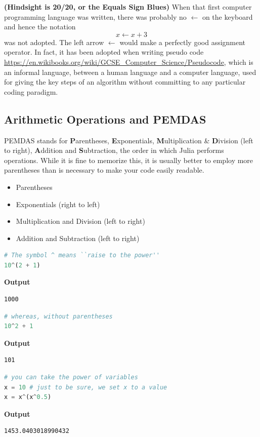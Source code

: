 \begin{rem} \textbf{(Hindsight is 20/20, or the Equals Sign Blues)}
When that first computer programming language was written, there was probably no $\leftarrow$ on the keyboard and hence the notation 
$$ x \leftarrow x+3$$
was not adopted. The left arrow $\leftarrow$ would make a perfectly good assignment operator. In fact, it has been adopted when writing pseudo code \url{https://en.wikibooks.org/wiki/GCSE_Computer_Science/Pseudocode}, which is an informal language, between a human language and a computer language, used for giving the key steps of an algorithm without committing to any particular coding paradigm.
\end{rem}


\subsection{Arithmetic Operations and PEMDAS}

PEMDAS stands for \textbf{P}arentheses, \textbf{E}xponentials, \textbf{M}ultiplication \& \textbf{D}ivision (left to right), \textbf{A}ddition and \textbf{S}ubtraction, the order in which Julia performs operations. While it is fine to memorize this, it is usually better to employ more parentheses than is necessary to make your code easily readable.
\begin{itemize}
    \item Parentheses
\item Exponentials (right to left)
\item Multiplication and Division (left to right)
\item Addition and Subtraction (left to right)
\end{itemize}

\begin{lstlisting}[language=Julia,style=mystyle]
# The symbol ^ means ``raise to the power''
10^(2 + 1)
\end{lstlisting}
\textbf{Output} 
\begin{verbatim}
1000
\end{verbatim}

\begin{lstlisting}[language=Julia,style=mystyle]
# whereas, without parentheses
10^2 + 1
\end{lstlisting}
\textbf{Output} 
\begin{verbatim}
101
\end{verbatim}


\begin{lstlisting}[language=Julia,style=mystyle]
# you can take the power of variables
x = 10 # just to be sure, we set x to a value
x = x^(x^0.5)
\end{lstlisting}
\textbf{Output} 
\begin{verbatim}
1453.0403018990432
\end{verbatim}


